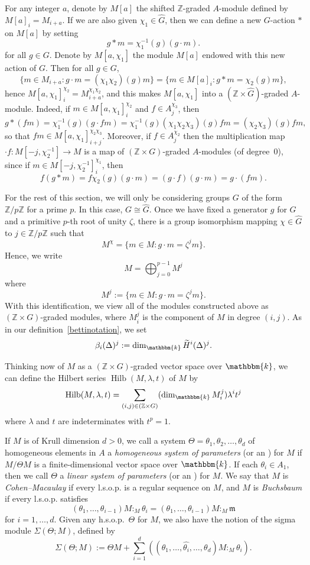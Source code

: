 \documentclass[ALCO,ThmDefs,Unicode]{cedram}
\DeclareMathOperator{\Hilb}{Hilb}
\newcommand{\field}{\mathbbm{k}}
\newcommand{\ZZ}{{\mathbb Z}}
\newcommand{\mideal}{\ensuremath{\mathfrak{m}}}
\begin{document}
For any integer $a$, denote by $M[a]$ the shifted $\ZZ$-graded $A$-module defined by $M[a]_i=M_{i+a}$. If we are also given $\chi_1\in\hat{G}$, then we can define a new $G$-action $*$ on $M[a]$ by setting
\[
g*m=\chi_1^{-1}(g) (g\cdot m).
\]
for all $g\in G$. Denote by $M[a, \chi_1]$ the module $M[a]$ endowed with this new action of $G$. Then for all $g\in G$,
\[
\{m\in M_{i+a}:g\cdot m = (\chi_1\chi_2)(g)m\}=\{m\in M[a]_i:g * m = \chi_2(g) m\},
\]
hence $M[a, \chi_1]_i^{\chi_2}=M_{i+a}^{\chi_1\chi_2}$, and this makes $M[a, \chi_1]$ into a $(\ZZ\times \hat{G})$-graded $A$-module. Indeed, if $m\in M[a, \chi_1]_i^{\chi_2}$ and $f\in A_j^{\chi_3}$, then
\[
g*(fm)=\chi_1^{-1}(g)(g\cdot fm)=\chi_1^{-1}(g)(\chi_1\chi_2\chi_3)(g)fm=(\chi_2\chi_3)(g)fm,
\]
so that $fm\in M[a, \chi_1]_{i+j}^{\chi_2\chi_3}$. Moreover, if $f\in A_j^{\chi_2}$ then the multiplication map $\cdot f: M[-j, \chi_2^{-1}]\to M$ is a map of $(\ZZ\times G)$-graded $A$-modules (of degree~$0$), since if $m\in M[-j, \chi_2^{-1}]_i^{\chi_1}$, then
\[
f(g*m)=f\chi_2(g)(g\cdot m)=(g\cdot f)(g\cdot m)=g\cdot(fm).
\]

For the rest of this section, we will only be considering groups $G$ of the form $\ZZ/p\ZZ$ for a prime $p$. In this case, $G\cong\hat{G}$. Once we have fixed a generator $g$ for $G$ and a primitive $p$-th root of unity $\zeta$, there is a group isomorphism mapping $\chi\in \hat{G}$ to $j\in\ZZ/p\ZZ$ such that
\[
M^{\chi}=\{m\in M: g\cdot m = \zeta^jm\}.
\]
Hence, we write
\[
M=\bigoplus_{j=0}^{p-1}M^j
\]
where
\[
M^j:=\{m\in M: g\cdot m = \zeta^jm\}.
\]
With this identification, we view all of the modules constructed above as $(\ZZ\times G)$-graded modules, where $M_i^j$ is the component of $M$ in degree $(i, j)$. As in our definition~\eqref{bettinotation}, we set
\begin{equation}\label{bettiJnotation}
\beta_i(\Delta)^j:=\dim_\field \widetilde{H}^i(\Delta)^j.
\end{equation}

Thinking now of $M$ as a $(\ZZ\times G)$-graded vector space over $\field$, we can define the Hilbert series $\Hilb(M, \lambda, t)$ of $M$ by
\[
\Hilb(M, \lambda, t)=\sum_{(i, j)\in (\ZZ\times G)}(\dim_\field M_i^j)\lambda^it^j
\]
where $\lambda$ and $t$ are indeterminates with $t^p=1$.

If $M$ is of Krull dimension $d>0$, we call a system $\Theta = \theta_1, \theta_2, \ldots, \theta_d$ of homogeneous elements in $A$ a \emph{homogeneous system of parameters} (or an ) for $M$ if $M/\Theta M$ is a finite-dimensional vector space over $\field$. If each $\theta_i\in A_1$, then we call $\Theta$ a \emph{linear system of parameters} (or an ) for $M$. We say that $M$ is \emph{Cohen--Macaulay} if every l.s.o.p. is a regular sequence on $M$, and $M$ is \emph{Buchsbaum} if every l.s.o.p. satisfies
\[
(\theta_1, \ldots, \theta_{i-1})M:_M\theta_i = (\theta_1, \ldots, \theta_{i-1})M:_M\mideal
\]
for $i=1, \ldots, d$. Given any h.s.o.p.~$\Theta$ for $M$, we also have the notion of the sigma module $\Sigma(\Theta; M)$, defined by
\[
\Sigma(\Theta; M):=\Theta M + \sum_{i=1}^d\left((\theta_1, \ldots, \hat{\theta_i}, \ldots, \theta_d)M:_M\theta_i\right).
\]
\end{document}
